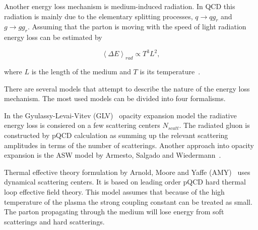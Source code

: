 Another energy loss mechanism is medium-induced radiation. In QCD this radiation is mainly due to the elementary splitting processes, $q\rightarrow qg_r$ and $g\rightarrow gg_r$. Assuming that the parton is moving with the speed of light radiation energy loss can be estimated by

\begin{equation}
\left<\Delta E\right>_{rad}\propto T^3L^2,
\end{equation}

\noindent where $L$ is the length of the medium and $T$ is its temperature~\cite{Dominguez:2008vd}.


There are several models that attempt to describe the nature of the energy loss mechanism. The most used models can be divided into four formalisms.
%

In the Gyulassy-Levai-Vitev (GLV)~\cite{Gyulassy:1999zd} opacity expansion model
 the radiative energy loss is consiered on a few scattering centers $N_{scatt}$. The radiated gluon is constructed by pQCD calculation as summing up the relevant scattering amplitudes in terms of the number of scatterings. Another approach into opacity expansion is the ASW model by Armesto, Salgado and Wiedermann~\cite{Wiedemann:2000za}.

Thermal effective theory formulation by Arnold, Moore and Yaffe (AMY)~\cite{Arnold:2001ms} uses dynamical scattering centers. It is based on leading order pQCD hard thermal loop effective field theory. This model assumes that because of the high temperature of the plasma the strong coupling constant can be treated as small. The parton propagating through the medium will lose energy from soft scatterings and hard scatterings.

